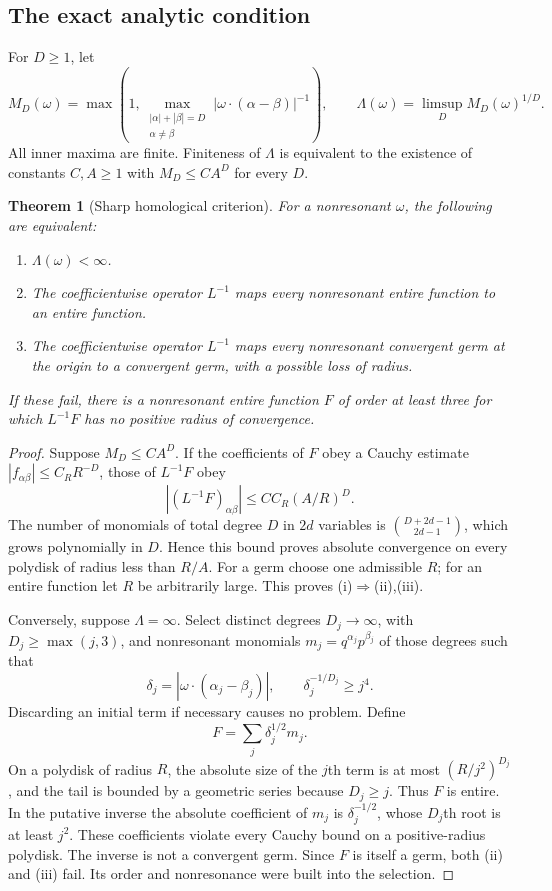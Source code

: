 \documentclass[11pt,letterpaper]{article}
\numberwithin{equation}{section}
\newtheorem{theorem}{Theorem}[section]
\theoremstyle{definition}
\theoremstyle{remark}
\begin{document}
\subsection{The exact analytic condition}
For $D\ge1$, let
\begin{equation}\label{eq:MD}
 M_D(\omega)=\max\left(1,
 \max_{\substack{|\alpha|+|\beta|=D\\\alpha\ne\beta}}
      |\omega\cdot(\alpha-\beta)|^{-1}\right),
 \qquad \Lambda(\omega)=\limsup_D M_D(\omega)^{1/D}.
\end{equation}
All inner maxima are finite. Finiteness of $\Lambda$ is equivalent to the
existence of constants $C,A\ge1$ with $M_D\le CA^D$ for every $D$.

\begin{theorem}[Sharp homological criterion]\label{thm:homological}
For a nonresonant $\omega$, the following are equivalent:
\begin{enumerate}[label=(\roman*)]
\item $\Lambda(\omega)<\infty$.
\item The coefficientwise operator $L^{-1}$ maps every nonresonant entire
function to an entire function.
\item The coefficientwise operator $L^{-1}$ maps every nonresonant
convergent germ at the origin to a convergent germ, with a possible loss of
radius.
\end{enumerate}
If these fail, there is a nonresonant entire function $F$ of order at least
three for which $L^{-1}F$ has no positive radius of convergence.
\end{theorem}
\begin{proof}
Suppose $M_D\le CA^D$. If the coefficients of $F$ obey a Cauchy estimate
$|f_{\alpha\beta}|\le C_RR^{-D}$, those of $L^{-1}F$ obey
\[
 |(L^{-1}F)_{\alpha\beta}|\le CC_R(A/R)^D.
\]
The number of monomials of total degree $D$ in $2d$ variables is
$\binom{D+2d-1}{2d-1}$, which grows polynomially in $D$. Hence this bound
proves absolute convergence on every polydisk of radius less than $R/A$.
For a germ choose one admissible $R$; for an entire function let $R$ be
arbitrarily large. This proves (i)$\Rightarrow$(ii),(iii).

Conversely, suppose $\Lambda=\infty$. Select distinct degrees $D_j\to\infty$,
with $D_j\ge\max(j,3)$, and nonresonant monomials
$m_j=q^{\alpha_j}p^{\beta_j}$ of those degrees such that
\[
 \delta_j=|\omega\cdot(\alpha_j-\beta_j)|,
 \qquad \delta_j^{-1/D_j}\ge j^4.
\]
Discarding an initial term if necessary causes no problem. Define
\begin{equation}\label{eq:sparseF}
 F=\sum_j \delta_j^{1/2}m_j.
\end{equation}
On a polydisk of radius $R$, the absolute size of the $j$th term is at most
$(R/j^2)^{D_j}$, and the tail is bounded by a geometric series because
$D_j\ge j$. Thus $F$ is entire. In the putative inverse the absolute
coefficient of $m_j$ is $\delta_j^{-1/2}$, whose $D_j$th root is at least
$j^2$. These coefficients violate every Cauchy bound on a positive-radius
polydisk. The inverse is not a convergent germ. Since $F$ is itself a germ,
both (ii) and (iii) fail. Its order and nonresonance were built into the
selection.
\end{proof}
\end{document}
